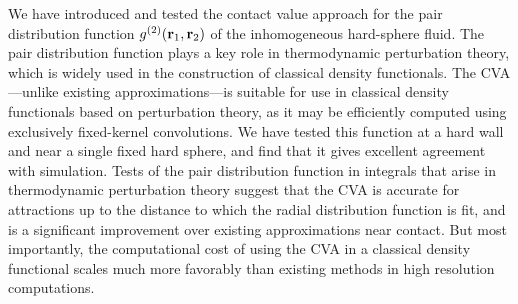 We have introduced and tested the contact value approach for the pair
distribution function $g^{(2)}(\textbf{r}_1,\textbf{r}_2)$ of the inhomogeneous
hard-sphere fluid.  The pair distribution function plays a key role in
thermodynamic perturbation theory, which is widely used in the
construction of classical density functionals.  The CVA---unlike
existing approximations---is suitable for use in classical density
functionals based on perturbation theory, as it may be efficiently
computed using exclusively fixed-kernel convolutions.  We have tested
this function at a hard wall and near a single fixed hard sphere, and
find that it gives excellent agreement with simulation.  Tests of the
pair distribution function in integrals that arise in thermodynamic
perturbation theory suggest that the CVA is accurate for attractions
up to the distance to which the radial distribution function is fit,
and is a significant improvement over existing approximations near
contact.  But most importantly, the computational cost of using the
CVA in a classical density functional scales much more favorably than
existing methods in high resolution computations.

\clearpage
